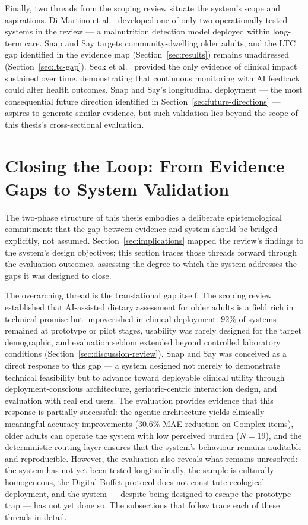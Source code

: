 Finally, two threads from the scoping review situate the system's scope and aspirations. Di Martino et al.\ \citep{dimartinoMalnutritionRiskAssessment2021} developed one of only two operationally tested systems in the review --- a malnutrition detection model deployed within long-term care. Snap and Say targets community-dwelling older adults, and the LTC gap identified in the evidence map (Section~\ref{sec:results}) remains unaddressed (Section~\ref{sec:ltc-gap}). Seok et al.\ \citep{seokFeasibilityEfficacyTouchCare2022} provided the only evidence of clinical impact sustained over time, demonstrating that continuous monitoring with AI feedback could alter health outcomes. Snap and Say's longitudinal deployment --- the most consequential future direction identified in Section~\ref{sec:future-directions} --- aspires to generate similar evidence, but such validation lies beyond the scope of this thesis's cross-sectional evaluation.

\section{Closing the Loop: From Evidence Gaps to System Validation}

The two-phase structure of this thesis embodies a deliberate epistemological commitment: that the gap between evidence and system should be bridged explicitly, not assumed. Section~\ref{sec:implications} mapped the review's findings to the system's design objectives; this section traces those threads forward through the evaluation outcomes, assessing the degree to which the system addresses the gaps it was designed to close.

The overarching thread is the translational gap itself. The scoping review established that AI-assisted dietary assessment for older adults is a field rich in technical promise but impoverished in clinical deployment: $92\%$ of systems remained at prototype or pilot stages, usability was rarely designed for the target demographic, and evaluation seldom extended beyond controlled laboratory conditions (Section~\ref{sec:discussion-review}). Snap and Say was conceived as a direct response to this gap --- a system designed not merely to demonstrate technical feasibility but to advance toward deployable clinical utility through deployment-conscious architecture, geriatric-centric interaction design, and evaluation with real end users. The evaluation provides evidence that this response is partially successful: the agentic architecture yields clinically meaningful accuracy improvements ($30.6\%$ MAE reduction on Complex items), older adults can operate the system with low perceived burden ($N=19$), and the deterministic routing layer ensures that the system's behaviour remains auditable and reproducible. However, the evaluation also reveals what remains unresolved: the system has not yet been tested longitudinally, the sample is culturally homogeneous, the Digital Buffet protocol does not constitute ecological deployment, and the system --- despite being designed to escape the prototype trap --- has not yet done so. The subsections that follow trace each of these threads in detail.


